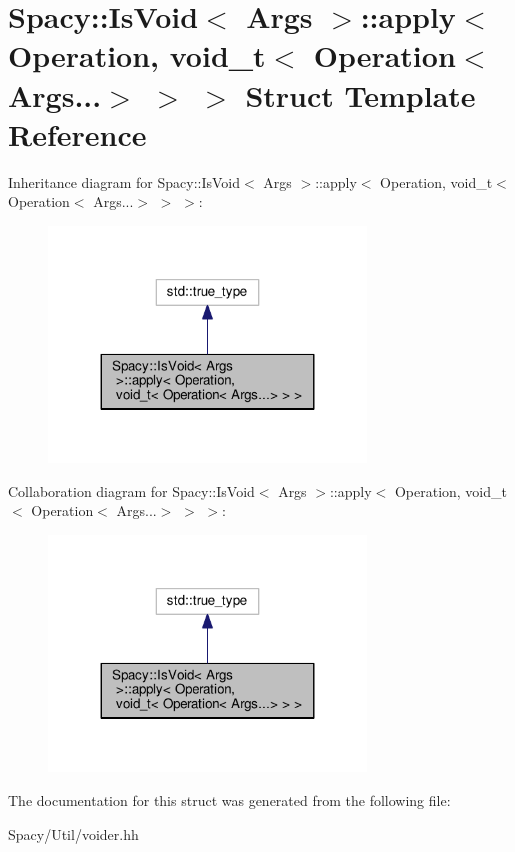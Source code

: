 \hypertarget{structSpacy_1_1IsVoid_1_1apply_3_01Operation_00_01void__t_3_01Operation_3_01Args_8_8_8_4_01_4_01_4}{}\section{Spacy\+:\+:Is\+Void$<$ Args $>$\+:\+:apply$<$ Operation, void\+\_\+t$<$ Operation$<$ Args...$>$ $>$ $>$ Struct Template Reference}
\label{structSpacy_1_1IsVoid_1_1apply_3_01Operation_00_01void__t_3_01Operation_3_01Args_8_8_8_4_01_4_01_4}


Inheritance diagram for Spacy\+:\+:Is\+Void$<$ Args $>$\+:\+:apply$<$ Operation, void\+\_\+t$<$ Operation$<$ Args...$>$ $>$ $>$\+:\nopagebreak
\begin{figure}[H]
\begin{center}
\leavevmode
\includegraphics[width=239pt]{structSpacy_1_1IsVoid_1_1apply_3_01Operation_00_01void__t_3_01Operation_3_01Args_8_8_8_4_01_4_01_4__inherit__graph}
\end{center}
\end{figure}


Collaboration diagram for Spacy\+:\+:Is\+Void$<$ Args $>$\+:\+:apply$<$ Operation, void\+\_\+t$<$ Operation$<$ Args...$>$ $>$ $>$\+:\nopagebreak
\begin{figure}[H]
\begin{center}
\leavevmode
\includegraphics[width=239pt]{structSpacy_1_1IsVoid_1_1apply_3_01Operation_00_01void__t_3_01Operation_3_01Args_8_8_8_4_01_4_01_4__coll__graph}
\end{center}
\end{figure}


The documentation for this struct was generated from the following file\+:\begin{DoxyCompactItemize}
\item 
Spacy/\+Util/voider.\+hh\end{DoxyCompactItemize}
